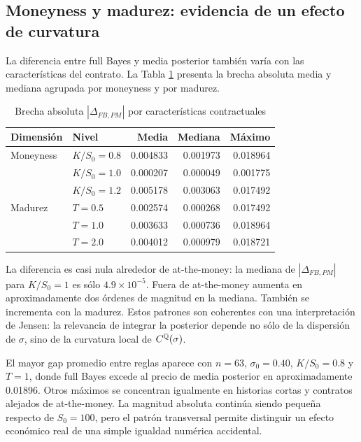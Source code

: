 \subsection{Moneyness y madurez: evidencia de un efecto de curvatura}

La diferencia entre full Bayes y media posterior también varía con las características del contrato. La Tabla \ref{tab:curvature} presenta la brecha absoluta media y mediana agrupada por moneyness y por madurez.

\begin{table}[H]
\centering
\caption{Brecha absoluta $|\Delta_{FB,PM}|$ por características contractuales}
\label{tab:curvature}
\begin{tabular}{llrrr}
\toprule
Dimensión & Nivel & Media & Mediana & Máximo \\
\midrule
Moneyness & $K/S_0=0.8$ & 0.004833 & 0.001973 & 0.018964 \\
          & $K/S_0=1.0$ & 0.000207 & 0.000049 & 0.001775 \\
          & $K/S_0=1.2$ & 0.005178 & 0.003063 & 0.017492 \\
\addlinespace
Madurez   & $T=0.5$ & 0.002574 & 0.000268 & 0.017492 \\
          & $T=1.0$ & 0.003633 & 0.000736 & 0.018964 \\
          & $T=2.0$ & 0.004012 & 0.000979 & 0.018721 \\
\bottomrule
\end{tabular}
\end{table}

La diferencia es casi nula alrededor de at-the-money: la mediana de $|\Delta_{FB,PM}|$ para $K/S_0=1$ es sólo $4.9\times10^{-5}$. Fuera de at-the-money aumenta en aproximadamente dos órdenes de magnitud en la mediana. También se incrementa con la madurez. Estos patrones son coherentes con una interpretación de Jensen: la relevancia de integrar la posterior depende no sólo de la dispersión de $\sigma$, sino de la curvatura local de $C^{\mathbb{Q}}(\sigma)$.

El mayor gap promedio entre reglas aparece con $n=63$, $\sigma_0=0.40$, $K/S_0=0.8$ y $T=1$, donde full Bayes excede al precio de media posterior en aproximadamente 0.01896. Otros máximos se concentran igualmente en historias cortas y contratos alejados de at-the-money. La magnitud absoluta continúa siendo pequeña respecto de $S_0=100$, pero el patrón transversal permite distinguir un efecto económico real de una simple igualdad numérica accidental.

